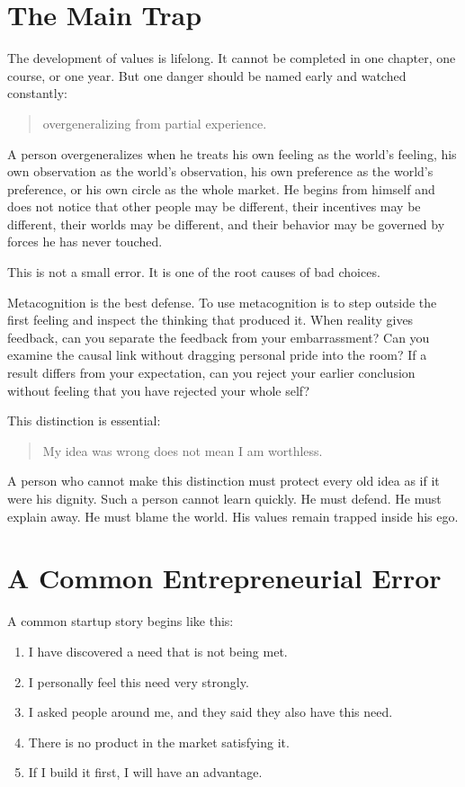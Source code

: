 \section*{The Main Trap}

The development of values is lifelong. It cannot be completed in one chapter, one course, or one year. But one danger should be named early and watched constantly:

\begin{quote}
overgeneralizing from partial experience.
\end{quote}

A person overgeneralizes when he treats his own feeling as the world's feeling, his own observation as the world's observation, his own preference as the world's preference, or his own circle as the whole market. He begins from himself and does not notice that other people may be different, their incentives may be different, their worlds may be different, and their behavior may be governed by forces he has never touched.

This is not a small error. It is one of the root causes of bad choices.

Metacognition is the best defense. To use metacognition is to step outside the first feeling and inspect the thinking that produced it. When reality gives feedback, can you separate the feedback from your embarrassment? Can you examine the causal link without dragging personal pride into the room? If a result differs from your expectation, can you reject your earlier conclusion without feeling that you have rejected your whole self?

This distinction is essential:

\begin{quote}
My idea was wrong does not mean I am worthless.
\end{quote}

A person who cannot make this distinction must protect every old idea as if it were his dignity. Such a person cannot learn quickly. He must defend. He must explain away. He must blame the world. His values remain trapped inside his ego.

\section*{A Common Entrepreneurial Error}

A common startup story begins like this:

\begin{enumerate}
\item I have discovered a need that is not being met.
\item I personally feel this need very strongly.
\item I asked people around me, and they said they also have this need.
\item There is no product in the market satisfying it.
\item If I build it first, I will have an advantage.
\end{enumerate}

